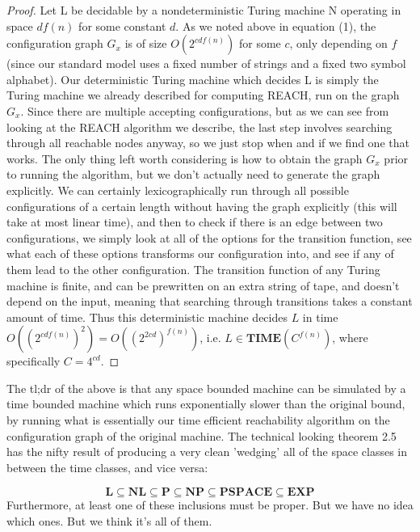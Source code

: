 \begin{proof}
Let L be decidable by a nondeterministic Turing machine N operating in space $df(n)$ for some constant $d$. As we noted above in equation (1), the configuration graph $G_x$ is of size $O(2^{cdf(n)})$ for some $c$, only depending on $f$ (since our standard model uses a fixed number of strings and a fixed two symbol alphabet). Our deterministic Turing machine which decides L is simply the Turing machine we already described for computing REACH, run on the graph $G_x$. Since there are multiple accepting configurations, but as we can see from looking at the REACH algorithm we describe, the last step involves searching through all reachable nodes anyway, so we just stop when and if we find one that works. The only thing left worth considering is how to obtain the graph $G_x$ prior to running the algorithm, but we don't actually need to generate the graph explicitly. We can certainly lexicographically run through all possible configurations of a certain length without having the graph explicitly (this will take at most linear time), and then to check if there is an edge between two configurations, we simply look at all of the options for the transition function, see what each of these options transforms our configuration into, and see if any of them lead to the other configuration. The transition function of any Turing machine is finite, and can be prewritten on an extra string of tape, and doesn't depend on the input, meaning that searching through transitions takes a constant amount of time. Thus this deterministic machine decides $L$ in time $O((2^{cdf(n)})^2) = O((2^{2cd})^{f(n)})$, i.e. $L \in \textbf{TIME}(C^{f(n)})$, where specifically $C = 4^{cd}$.
\end{proof}
The tl;dr of the above is that any space bounded machine can be simulated by a time bounded machine which runs exponentially slower than the original bound, by running what is essentially our time efficient reachability algorithm on the configuration graph of the original machine. The technical looking theorem 2.5 has the nifty result of producing a very clean 'wedging' all of the space classes in between the time classes, and vice versa:
\begin{corollary}
    \[ \textbf{L} \subseteq \textbf{NL} \subseteq \textbf{P} \subseteq \textbf{NP} \subseteq \textbf{PSPACE} \subseteq \textbf{EXP} \]
    Furthermore, at least one of these inclusions must be proper. But we have no idea which ones. But we think it's all of them.
\end{corollary}
